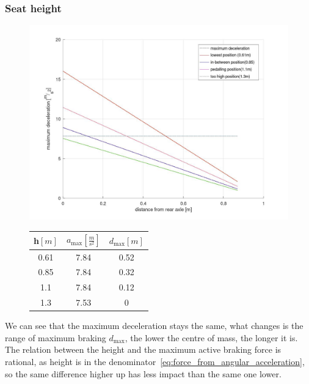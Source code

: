 \documentclass[12pt, a4]{article}
\begin{document}
\subsubsection{Seat height}
\begin{figure}[H]
\begin{minipage}[t]{.6\linewidth}
\vspace{0pt}
\includegraphics[width = \linewidth]{height_on_braking}
\end{minipage}%
\begin{minipage}[t]{0.4\linewidth}
\vspace{0pt}
\centering
\begin{tabular}{|c | c | c|} 
\hline
 h$[m]$ & $a_{\max} [\frac{m}{s^2}]$ & $d_{\max}[m]$ \\ [0.5ex] 
\hline\hline
0.61 & 7.84 & 0.52 \\ [1ex] 
0.85 & 7.84 & 0.32 \\ [1ex]
1.1 & 7.84 & 0.12 \\ [1ex]
1.3 & 7.53 & 0 \\ [1ex]
\hline
\end{tabular}
\end{minipage}%
\caption{}%
\label{friction_on_braking}
\end{figure}
We can see that the maximum deceleration stays the same, what changes is the range of maximum braking $d_{\max}$, the lower the 
centre of mass, the longer it is. The relation between the height and the maximum active braking force is rational, as height is 
in the denominator~\eqref{eq:force_from_angular_acceleration}, so the same difference higher up has less impact than the same one lower.
\end{document}
